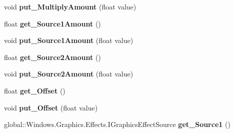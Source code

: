 \begin{DoxyCompactItemize}
void {\bfseries put\+\_\+\+Multiply\+Amount} (float value)
\item 
\mbox{\label{class_microsoft_1_1_graphics_1_1_canvas_1_1_effects_1_1_arithmetic_composite_effect_acee4afc524bfdb231a20ae25f42cabd1}} 
float {\bfseries get\+\_\+\+Source1\+Amount} ()
\item 
\mbox{\label{class_microsoft_1_1_graphics_1_1_canvas_1_1_effects_1_1_arithmetic_composite_effect_adbeee0520fe2b3a924d78512f25067ba}} 
void {\bfseries put\+\_\+\+Source1\+Amount} (float value)
\item 
\mbox{\label{class_microsoft_1_1_graphics_1_1_canvas_1_1_effects_1_1_arithmetic_composite_effect_adf15197bc98dd8f06bc3df1765d6588a}} 
float {\bfseries get\+\_\+\+Source2\+Amount} ()
\item 
\mbox{\label{class_microsoft_1_1_graphics_1_1_canvas_1_1_effects_1_1_arithmetic_composite_effect_a0347efa3cb7edaccc8f68ff9b9a1bf4c}} 
void {\bfseries put\+\_\+\+Source2\+Amount} (float value)
\item 
\mbox{\label{class_microsoft_1_1_graphics_1_1_canvas_1_1_effects_1_1_arithmetic_composite_effect_a957330b37ee0c41f98f12755d32b3d7a}} 
float {\bfseries get\+\_\+\+Offset} ()
\item 
\mbox{\label{class_microsoft_1_1_graphics_1_1_canvas_1_1_effects_1_1_arithmetic_composite_effect_a1a67e5996a5094679fc6468a213802fb}} 
void {\bfseries put\+\_\+\+Offset} (float value)
\item 
\mbox{\label{class_microsoft_1_1_graphics_1_1_canvas_1_1_effects_1_1_arithmetic_composite_effect_a22435f1073204355c7988e4add4dadcf}} 
global\+::\+Windows.\+Graphics.\+Effects.\+I\+Graphics\+Effect\+Source {\bfseries get\+\_\+\+Source1} ()

\end{DoxyCompactItemize}
